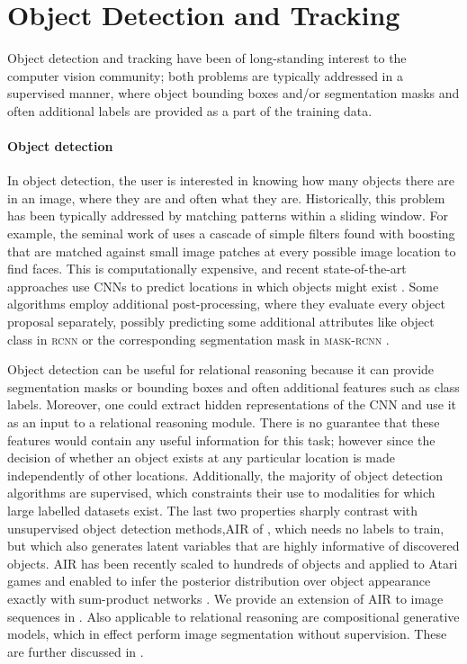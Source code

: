 \section{Object Detection and Tracking}
\label{sec:object_det_track}

Object detection and tracking have been of long-standing interest to the computer vision community;
both problems are typically addressed in a supervised manner, where object bounding boxes and/or segmentation masks and often additional labels are provided as a part of the training data.
\paragraph{Object detection}
In object detection, the user is interested in knowing how many objects there are in an image, where they are and often what they are. 
Historically, this problem has been typically addressed by matching patterns within a sliding window.
For example, the seminal work of \cite{Viola2001face} uses a cascade of simple filters found with boosting \citep{Schapire1999boosting} that are matched against small image patches at every possible image location to find faces.
This is computationally expensive, and recent state-of-the-art approaches use \gls{CNN}s to predict locations in which objects might exist \citep{Redmon15}.
Some algorithms employ additional post-processing, where they evaluate every object proposal separately, possibly predicting some additional attributes like object class in \textsc{rcnn} \citep{Girshick2013rcnn,Ren2015fasterrcnn} or the corresponding segmentation mask in \textsc{mask-rcnn} \citep{He2017maskrcnn}.

Object detection can be useful for relational reasoning because it can provide segmentation masks or bounding boxes and often additional features such as class labels.
Moreover, one could extract hidden representations of the \gls{CNN} and use it as an input to a relational reasoning module.
There is no guarantee that these features would contain any useful information for this task; however since the decision of whether an object exists at any particular location is made independently of other locations.
Additionally, the majority of object detection algorithms are supervised, which constraints their use to modalities for which large labelled datasets exist.
The last two properties sharply contrast with unsupervised object detection methods,\eg \gls{AIR} of \cite{Eslami2016air}, which needs no labels to train, but which also generates latent variables that are highly informative of discovered objects.
\gls{AIR} has been recently scaled to hundreds of objects and applied to Atari games \citep{Crawford2019spair,Jiang2019scalor} and enabled to infer the posterior distribution over object appearance exactly with sum-product networks \citep{Stelzner2019supair}.
We provide an extension of \gls{AIR} to image sequences in .
Also applicable to relational reasoning are compositional generative models, which in effect perform image segmentation without supervision.
These are further discussed in .

